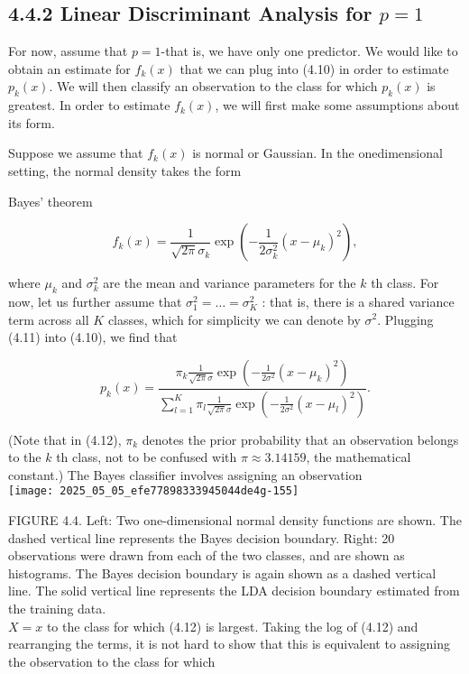 \documentclass[10pt]{article}
\begin{document}
\subsection*{4.4.2 Linear Discriminant Analysis for $p=1$}
For now, assume that $p=1$-that is, we have only one predictor. We would like to obtain an estimate for $f_{k}(x)$ that we can plug into (4.10) in order to estimate $p_{k}(x)$. We will then classify an observation to the class for which $p_{k}(x)$ is greatest. In order to estimate $f_{k}(x)$, we will first make some assumptions about its form.

Suppose we assume that $f_{k}(x)$ is normal or Gaussian. In the onedimensional setting, the normal density takes the form

Bayes' theorem


\begin{equation*}
f_{k}(x)=\frac{1}{\sqrt{2 \pi} \sigma_{k}} \exp \left(-\frac{1}{2 \sigma_{k}^{2}}\left(x-\mu_{k}\right)^{2}\right), \tag{4.11}
\end{equation*}


where $\mu_{k}$ and $\sigma_{k}^{2}$ are the mean and variance parameters for the $k$ th class. For now, let us further assume that $\sigma_{1}^{2}=\ldots=\sigma_{K}^{2}$ : that is, there is a shared variance term across all $K$ classes, which for simplicity we can denote by $\sigma^{2}$. Plugging (4.11) into (4.10), we find that


\begin{equation*}
p_{k}(x)=\frac{\pi_{k} \frac{1}{\sqrt{2 \pi} \sigma} \exp \left(-\frac{1}{2 \sigma^{2}}\left(x-\mu_{k}\right)^{2}\right)}{\sum_{l=1}^{K} \pi_{l} \frac{1}{\sqrt{2 \pi} \sigma} \exp \left(-\frac{1}{2 \sigma^{2}}\left(x-\mu_{l}\right)^{2}\right)} . \tag{4.12}
\end{equation*}


(Note that in (4.12), $\pi_{k}$ denotes the prior probability that an observation belongs to the $k$ th class, not to be confused with $\pi \approx 3.14159$, the mathematical constant.) The Bayes classifier involves assigning an observation\\
\texttt{[image: 2025\_05\_05\_efe77898333945044de4g-155]}

FIGURE 4.4. Left: Two one-dimensional normal density functions are shown. The dashed vertical line represents the Bayes decision boundary. Right: 20 observations were drawn from each of the two classes, and are shown as histograms. The Bayes decision boundary is again shown as a dashed vertical line. The solid vertical line represents the LDA decision boundary estimated from the training data.\\
$X=x$ to the class for which (4.12) is largest. Taking the log of (4.12) and rearranging the terms, it is not hard to show that this is equivalent to assigning the observation to the class for which
\end{document}
